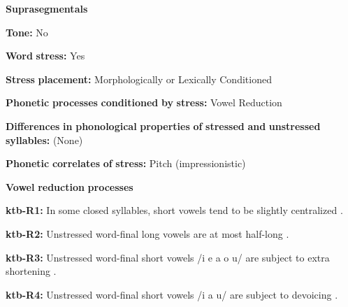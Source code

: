 \begin{styleBody}
\textbf{Suprasegmentals}
\end{styleBody}

\begin{styleBody}
\textbf{Tone:} No
\end{styleBody}

\begin{styleBody}
\textbf{Word} \textbf{stress:} Yes
\end{styleBody}

\begin{styleBody}
\textbf{Stress} \textbf{placement:} Morphologically or Lexically Conditioned
\end{styleBody}

\begin{styleBody}
\textbf{Phonetic} \textbf{processes} \textbf{conditioned} \textbf{by} \textbf{stress:} Vowel Reduction
\end{styleBody}

\begin{styleBody}
\textbf{Differences} \textbf{in} \textbf{phonological} \textbf{properties} \textbf{of} \textbf{stressed} \textbf{and} \textbf{unstressed} \textbf{syllables:} (None)
\end{styleBody}

\begin{styleBody}
\textbf{Phonetic} \textbf{correlates} \textbf{of} \textbf{stress:} Pitch (impressionistic)
\end{styleBody}

\begin{styleBody}
\textbf{Vowel} \textbf{reduction} \textbf{processes}
\end{styleBody}

\begin{styleBody}
\textbf{ktb-R1:} In some closed syllables, short vowels tend to be slightly centralized \citep[18]{Treis2008}.
\end{styleBody}

\begin{styleBody}
\textbf{ktb-R2:} Unstressed word-final long vowels are at most half-long \citep[19]{Treis2008}.
\end{styleBody}

\begin{styleBody}
\textbf{ktb-R3:} Unstressed word-final short vowels /i e a o u/ are subject to extra shortening \citep[20]{Treis2008}.
\end{styleBody}

\begin{styleBody}
\textbf{ktb-R4:} Unstressed word-final short vowels /i a u/ are subject to devoicing \citep[20]{Treis2008}.
\end{styleBody}

